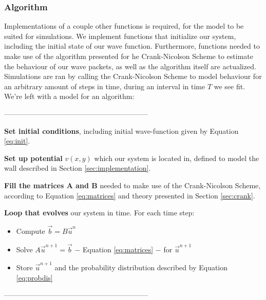 \documentclass[10pt, nofootinbib, twocolumn]{revtex4-1}
\begin{document}
\subsubsection{Algorithm}\label{sec:algorithm} 
Implementations of a couple other functions is required, for the model to be suited for simulations. We implement functions that initialize our system, including the initial state of our wave function. Furthermore, functions needed to make use of the algorithm presented for he Crank-Nicolson Scheme to estimate the behaviour of our wave packets, as well as the algorithm itself are actualized. Simulations are ran by calling the Crank-Nicolson Scheme to model behaviour for an arbitrary amount of steps in time, during an interval in time $T$ we see fit. We're left with a model for an algorithm:\\

\begin{center} ------------------------------------------------------------ \end{center}
\begin{description}[]
    \item \textbf{Set initial conditions}, including initial wave-function given by Equation \eqref{eq:init}.
    \item \textbf{Set up potential} \( v(x, y) \) which our system is located in, defined to model the wall described in Section \ref{sec:implementation}. 
    \item \textbf{Fill the matrices A and B} needed to make use of the Crank-Nicolson Scheme, according to Equation \eqref{eq:matrices} and theory presented in Section \ref{sec:crank}.
    \item \textbf{Loop that evolves} our system in time. For each time step:
    \begin{itemize}
        \item Compute  \( \vec{b} = B \vec{u}^n \)
        \item Solve \( A \vec{u}^{n+1} = \vec{b} \) $-$ Equation \eqref{eq:matrices} $-$ for \( \vec{u}^{n+1} \)
        \item Store \( \vec{u}^{n+1} \) and the probability distribution described by Equation \eqref{eq:probdis}
    \end{itemize}
\end{description}
\begin{center} ------------------------------------------------------------ \end{center}
\end{document}
